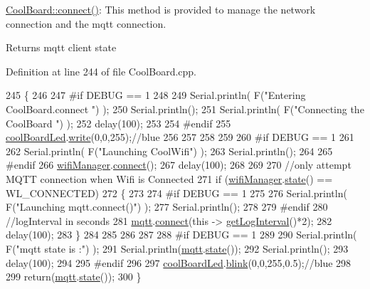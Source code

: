 \hyperlink{class_cool_board_a519de78b807f8ec6463ff484eb925918}{Cool\+Board\+::connect()}\+: This method is provided to manage the network connection and the mqtt connection.

\begin{DoxyReturn}{Returns}
mqtt client state 
\end{DoxyReturn}


Definition at line 244 of file Cool\+Board.\+cpp.


\begin{DoxyCode}
245 \{
246 
247 \textcolor{preprocessor}{#if DEBUG == 1  }
248 
249     Serial.println( F(\textcolor{stringliteral}{"Entering CoolBoard.connect "}) );
250     Serial.println();
251     Serial.println( F(\textcolor{stringliteral}{"Connecting the CoolBoard  "}) );
252     delay(100);
253 
254 \textcolor{preprocessor}{#endif}
255     \hyperlink{class_cool_board_a1b1d3c684a5baa56b08486e192fd8e97}{coolBoardLed}.\hyperlink{class_cool_board_led_a30fadd4cbec17ceea428bf7a32207e87}{write}(0,0,255);\textcolor{comment}{//blue}
256 
257     
258             
259     
260 \textcolor{preprocessor}{#if DEBUG == 1      }
261 
262     Serial.println( F(\textcolor{stringliteral}{"Launching CoolWifi"}) );
263     Serial.println();
264 
265 \textcolor{preprocessor}{#endif}
266     \hyperlink{class_cool_board_acd88e6003606b47479ebba81e4aceeca}{wifiManager}.\hyperlink{class_cool_wifi_ad060353050f40d032a2dbf9e54a768bf}{connect}();
267     delay(100);
268 
269 
270     \textcolor{comment}{//only attempt MQTT connection when Wifi is Connected}
271     \textcolor{keywordflow}{if} (\hyperlink{class_cool_board_acd88e6003606b47479ebba81e4aceeca}{wifiManager}.\hyperlink{class_cool_wifi_a1c7b4d82a4098d346e7593dce92039fa}{state}() == WL\_CONNECTED)
272     \{
273 
274 \textcolor{preprocessor}{    #if DEBUG == 1  }
275     
276         Serial.println( F(\textcolor{stringliteral}{"Launching mqtt.connect()"}) );
277         Serial.println();
278     
279 \textcolor{preprocessor}{    #endif  }
280         \textcolor{comment}{//logInterval in seconds}
281         \hyperlink{class_cool_board_a2399f44d7c23c1149a335cb3b46d90f1}{mqtt}.\hyperlink{class_cool_m_q_t_t_a50075d0ab23a327ab897fd6adad20eda}{connect}(\textcolor{keyword}{this} -> \hyperlink{class_cool_board_a7508e029f2ee17bb747ffab599285e0d}{getLogInterval}()*2);
282         delay(100);
283     \}
284     
285         
286     
287     
288 \textcolor{preprocessor}{#if DEBUG == 1}
289 
290     Serial.println( F(\textcolor{stringliteral}{"mqtt state is :"}) );
291     Serial.println(\hyperlink{class_cool_board_a2399f44d7c23c1149a335cb3b46d90f1}{mqtt}.\hyperlink{class_cool_m_q_t_t_a5d003307eff78efbd585e42b43b72b6d}{state}());
292     Serial.println();
293     delay(100);
294 
295 \textcolor{preprocessor}{#endif}
296 
297     \hyperlink{class_cool_board_a1b1d3c684a5baa56b08486e192fd8e97}{coolBoardLed}.\hyperlink{class_cool_board_led_a96e1ea13003eee34c9dbcef340404426}{blink}(0,0,255,0.5);\textcolor{comment}{//blue}
298 
299     \textcolor{keywordflow}{return}(\hyperlink{class_cool_board_a2399f44d7c23c1149a335cb3b46d90f1}{mqtt}.\hyperlink{class_cool_m_q_t_t_a5d003307eff78efbd585e42b43b72b6d}{state}());
300 \}
\end{DoxyCode}
